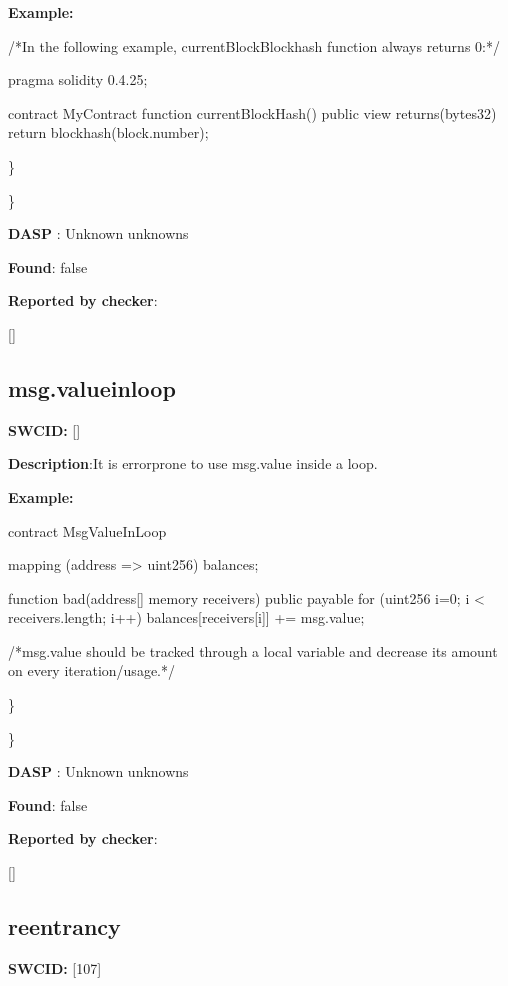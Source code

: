\documentclass{article}
\begin{document}
\textbf{Example:} 
\begin{ffcode} 

/*In the following example, currentBlockBlockhash function always returns 0:*/ 

pragma solidity 0.4.25;

contract MyContract {
    function currentBlockHash() public view returns(bytes32) {
        return blockhash(block.number);
    }
}

\end{ffcode} 
\} 

\} 

\textbf{DASP} : Unknown unknowns

\textbf{Found}: false

\textbf{Reported by checker}: 
\begin{ffcode} 

[]
\end{ffcode} 
\subsection{msg.value{\textunderscore}in{\textunderscore}loop} 
\textbf{SWC{\textunderscore}ID:} []

\textbf{Description}:It is error{\textendash}prone to use msg.value inside a loop.


\textbf{Example:} 
\begin{ffcode} 

contract MsgValueInLoop{
    mapping (address => uint256) balances;

    function bad(address[] memory receivers) public payable {
        for (uint256 i=0; i < receivers.length; i++) {
            balances[receivers[i]] += msg.value;
        }
    }
}

 /*msg.value should be tracked through a local variable and decrease its amount on every iteration/usage.*/ 

\end{ffcode} 
\} 

\} 

\textbf{DASP} : Unknown unknowns

\textbf{Found}: false

\textbf{Reported by checker}: 
\begin{ffcode} 

[]
\end{ffcode} 
\subsection{reentrancy} 
\textbf{SWC{\textunderscore}ID:} [107]
\end{document}
